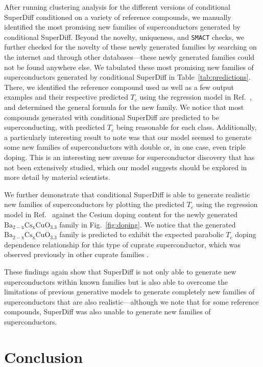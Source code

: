 \documentclass[%
reprint,
 amsmath,amssymb,
 aps,
prb,
]{revtex4-2}
\begin{document}
After running clustering analysis for the different versions of conditional SuperDiff conditioned on a variety of reference compounds, we manually identified the most promising new families of superconductors generated by conditional SuperDiff. Beyond the novelty, uniqueness, and \texttt{SMACT} checks, we further checked for the novelty of these newly generated families by searching on the internet and through other databases---these newly generated families could not be found anywhere else. We tabulated these most promising new families of superconductors generated by conditional SuperDiff in Table~\ref{tab:predictions}. There, we identified the reference compound used as well as a few output examples and their respective predicted $T_c$ using the regression model in Ref.~\cite{ROTER20201353689}, and determined the general formula for the new family. We notice that most compounds generated with conditional SuperDiff are predicted to be superconducting, with predicted $T_c$ being reasonable for each class. Additionally, a particularly interesting result to note was that our model seemed to generate some new families of superconductors with double or, in one case, even triple doping. This is an interesting new avenue for superconductor discovery that has not been extensively studied, which our model suggests should be explored in more detail by material scientists.

We further demonstrate that conditional SuperDiff is able to generate realistic new families of superconductors by plotting the predicted $T_c$ using the regression model in Ref.~\cite{ROTER20201353689} against the Cesium doping content for the newly generated $\mathrm{Ba_{2-x}Cs_{x}CuO_{3.3}}$ family in Fig.~\ref{fig:doping}. We notice that the generated $\mathrm{Ba_{2-x}Cs_{x}CuO_{3.3}}$ family is predicted to exhibit the expected parabolic $T_c$ doping dependence relationship for this type of cuprate superconductor, which was observed previously in other cuprate families \cite{TALLON200153}.

These findings again show that SuperDiff is not only able to generate new superconductors within known families but is also able to overcome the limitations of previous generative models to generate completely new families of superconductors that are also realistic---although we note that for some reference compounds, SuperDiff was also unable to generate new families of superconductors.


\section{Conclusion}
\label{conclusions}
\end{document}
